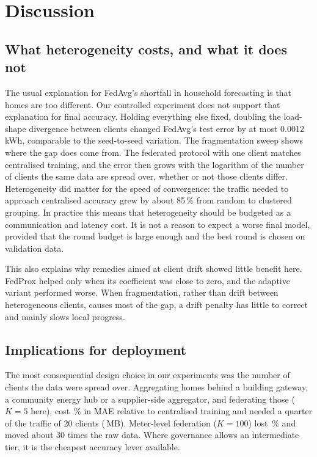 \section{Discussion}\label{sec:discussion}

\subsection{What heterogeneity costs, and what it does not}
The usual explanation for FedAvg's shortfall in household forecasting is that homes are too different. Our
controlled experiment does not support that explanation for final accuracy. Holding everything else fixed, doubling
the load-shape divergence between clients changed FedAvg's test error by at most 0.0012\,kWh, comparable to the
seed-to-seed variation.
The fragmentation sweep shows where the gap does come from. The federated protocol with one client matches
centralised training, and the error then grows with the logarithm of the number of clients the same data are spread
over, whether or not those clients differ.
Heterogeneity did matter for the speed of convergence: the traffic needed to approach centralised accuracy grew by
about 85\,\% from random to clustered grouping. In practice this means that heterogeneity should be budgeted as a
communication and latency cost. It is not a reason to expect a worse final model, provided that the round budget is
large enough and the best round is chosen on validation data.

This also explains why remedies aimed at client drift showed little benefit here. FedProx helped only when its
coefficient was close to zero, and the adaptive variant performed worse. When fragmentation, rather than drift between
heterogeneous clients, causes most of the gap, a drift penalty has little to correct and mainly slows local progress.

\subsection{Implications for deployment}
The most consequential design choice in our experiments was the number of clients the data were spread over.
Aggregating homes behind a building gateway, a community energy hub or a supplier-side aggregator, and federating
those ($K=5$ here), cost \EonefourfedavgKfiveGap{}\,\% in MAE relative to centralised training and needed a quarter of
the traffic of 20 clients (\EonefourfedavgKfiveMB{}\,MB). Meter-level federation ($K=100$) lost
\EonethreefedavghouseholdGap{}\,\% and moved about 30 times the raw data. Where governance allows an intermediate
tier, it is the cheapest accuracy lever available.

